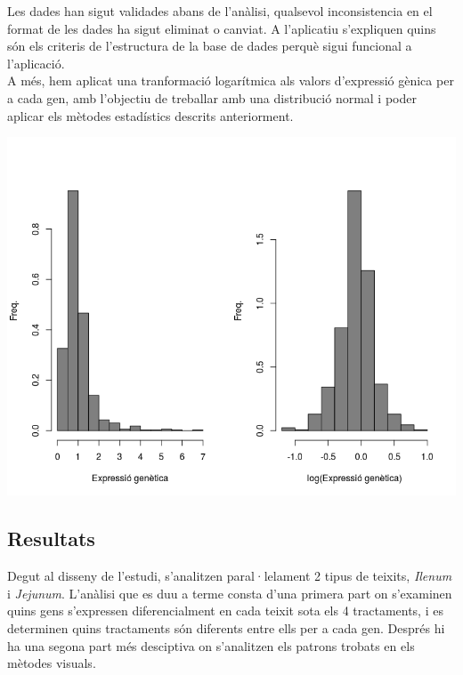 \documentclass[english]{article}
\begin{document}
Les dades han sigut validades abans de l'anàlisi, qualsevol inconsistencia en el format de les dades ha sigut eliminat o canviat. A l'aplicatiu s'expliquen quins són els criteris de l'estructura de la base de dades perquè sigui funcional a l'aplicació.
\\

A més, hem aplicat una tranformació logarítmica als valors d'expressió gènica per a cada gen, amb l'objectiu de treballar amb una distribució normal i poder aplicar els mètodes estadístics descrits anteriorment.
\begin{center}
\includegraphics[scale=0.45]{logsdades.png}
\end{center}
\clearpage
\subsection{Resultats}
Degut al disseny de l'estudi, s'analitzen paral·lelament 2 tipus de teixits, \textit{Ilenum} i \textit{Jejunum}. L'anàlisi que es duu a terme consta d'una primera part on s'examinen quins gens s'expressen diferencialment en cada teixit sota els 4 tractaments, i es determinen quins tractaments són diferents entre ells per a cada gen. Després hi ha una segona part més desciptiva on s'analitzen els patrons trobats en els mètodes visuals.
\end{document}
